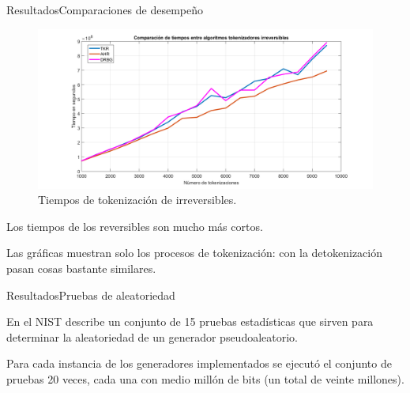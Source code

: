\begin{frame}{Resultados}{Comparaciones de desempeño}
  {
    \begin{figure}[H]
      \begin{center}
        \includegraphics[width=1.0\linewidth]
          {../../../diagramas_comunes/desempenio/tok_irrev.png}
        \caption{Tiempos de tokenización de irreversibles.}
      \end{center}
    \end{figure}
  }

  \note
  {
    Los tiempos de los reversibles son mucho más cortos.

    Las gráficas muestran solo los procesos de tokenización: con la
    detokenización pasan cosas bastante similares.
  }

\end{frame}

\begin{frame}{Resultados}{Pruebas de aleatoriedad}

  En \cite{nist_pruebas} el NIST describe un conjunto de 15 pruebas
  estadísticas que sirven para determinar la aleatoriedad de un generador
  pseudoaleatorio.

  Para cada instancia de los generadores implementados se ejecutó el conjunto
  de pruebas 20 veces, cada una con medio millón de bits (un total de veinte
  millones).

\end{frame}

